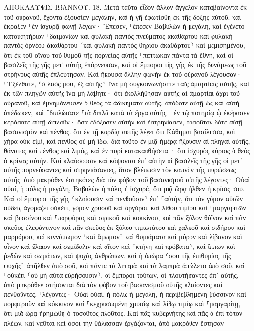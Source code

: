 \documentclass[twoside, 9pt]{extreport}
\begin{document}
ΑΠΟΚΑΛΥΨΙΣ ΙΩΑΝΝΟΥ.
18.
Μετὰ ταῦτα εἶδον ἄλλον ἄγγελον καταβαίνοντα ἐκ τοῦ οὐρανοῦ, ἔχοντα ἐξουσίαν μεγάλην, καὶ ἡ γῆ ἐφωτίσθη ἐκ τῆς δόξης αὐτοῦ. 
καὶ ἔκραξεν ⸀ἐν ἰσχυρᾷ φωνῇ λέγων· Ἔπεσεν, ⸀ἔπεσεν Βαβυλὼν ἡ μεγάλη, καὶ ἐγένετο κατοικητήριον ⸀δαιμονίων καὶ φυλακὴ παντὸς πνεύματος ἀκαθάρτου καὶ φυλακὴ παντὸς ὀρνέου ἀκαθάρτου ⸂καὶ φυλακὴ παντὸς θηρίου ἀκαθάρτου⸃ καὶ μεμισημένου, 
ὅτι ἐκ τοῦ οἴνου τοῦ θυμοῦ τῆς πορνείας αὐτῆς ⸀πέπτωκαν πάντα τὰ ἔθνη, καὶ οἱ βασιλεῖς τῆς γῆς μετ᾽ αὐτῆς ἐπόρνευσαν, καὶ οἱ ἔμποροι τῆς γῆς ἐκ τῆς δυνάμεως τοῦ στρήνους αὐτῆς ἐπλούτησαν. 
Καὶ ἤκουσα ἄλλην φωνὴν ἐκ τοῦ οὐρανοῦ λέγουσαν· ⸀Ἐξέλθατε, ⸂ὁ λαός μου, ἐξ αὐτῆς⸃, ἵνα μὴ συγκοινωνήσητε ταῖς ἁμαρτίαις αὐτῆς, καὶ ἐκ τῶν πληγῶν αὐτῆς ἵνα μὴ λάβητε· 
ὅτι ἐκολλήθησαν αὐτῆς αἱ ἁμαρτίαι ἄχρι τοῦ οὐρανοῦ, καὶ ἐμνημόνευσεν ὁ θεὸς τὰ ἀδικήματα αὐτῆς. 
ἀπόδοτε αὐτῇ ὡς καὶ αὐτὴ ἀπέδωκεν, καὶ ⸀διπλώσατε ⸀τὰ διπλᾶ κατὰ τὰ ἔργα αὐτῆς· ἐν τῷ ποτηρίῳ ᾧ ἐκέρασεν κεράσατε αὐτῇ διπλοῦν· 
ὅσα ἐδόξασεν αὑτὴν καὶ ἐστρηνίασεν, τοσοῦτον δότε αὐτῇ βασανισμὸν καὶ πένθος. ὅτι ἐν τῇ καρδίᾳ αὐτῆς λέγει ὅτι Κάθημαι βασίλισσα, καὶ χήρα οὐκ εἰμί, καὶ πένθος οὐ μὴ ἴδω. 
διὰ τοῦτο ἐν μιᾷ ἡμέρᾳ ἥξουσιν αἱ πληγαὶ αὐτῆς, θάνατος καὶ πένθος καὶ λιμός, καὶ ἐν πυρὶ κατακαυθήσεται· ὅτι ἰσχυρὸς κύριος ὁ θεὸς ὁ κρίνας αὐτήν. 
Καὶ κλαύσουσιν καὶ κόψονται ἐπ᾽ αὐτὴν οἱ βασιλεῖς τῆς γῆς οἱ μετ᾽ αὐτῆς πορνεύσαντες καὶ στρηνιάσαντες, ὅταν βλέπωσιν τὸν καπνὸν τῆς πυρώσεως αὐτῆς, 
ἀπὸ μακρόθεν ἑστηκότες διὰ τὸν φόβον τοῦ βασανισμοῦ αὐτῆς λέγοντες· Οὐαὶ οὐαί, ἡ πόλις ἡ μεγάλη, Βαβυλὼν ἡ πόλις ἡ ἰσχυρά, ὅτι μιᾷ ὥρᾳ ἦλθεν ἡ κρίσις σου. 
Καὶ οἱ ἔμποροι τῆς γῆς ⸂κλαίουσιν καὶ πενθοῦσιν⸃ ἐπ᾽ ⸀αὐτήν, ὅτι τὸν γόμον αὐτῶν οὐδεὶς ἀγοράζει οὐκέτι, 
γόμον χρυσοῦ καὶ ἀργύρου καὶ λίθου τιμίου καὶ ⸀μαργαριτῶν καὶ βυσσίνου καὶ ⸀πορφύρας καὶ σιρικοῦ καὶ κοκκίνου, καὶ πᾶν ξύλον θύϊνον καὶ πᾶν σκεῦος ἐλεφάντινον καὶ πᾶν σκεῦος ἐκ ξύλου τιμιωτάτου καὶ χαλκοῦ καὶ σιδήρου καὶ μαρμάρου, 
καὶ κιννάμωμον ⸂καὶ ἄμωμον⸃ καὶ θυμιάματα καὶ μύρον καὶ λίβανον καὶ οἶνον καὶ ἔλαιον καὶ σεμίδαλιν καὶ σῖτον καὶ ⸂κτήνη καὶ πρόβατα⸃, καὶ ἵππων καὶ ῥεδῶν καὶ σωμάτων, καὶ ψυχὰς ἀνθρώπων. 
καὶ ἡ ὀπώρα ⸂σου τῆς ἐπιθυμίας τῆς ψυχῆς⸃ ἀπῆλθεν ἀπὸ σοῦ, καὶ πάντα τὰ λιπαρὰ καὶ τὰ λαμπρὰ ἀπώλετο ἀπὸ σοῦ, καὶ ⸀οὐκέτι ⸂οὐ μὴ αὐτὰ εὑρήσουσιν⸃. 
οἱ ἔμποροι τούτων, οἱ πλουτήσαντες ἀπ᾽ αὐτῆς, ἀπὸ μακρόθεν στήσονται διὰ τὸν φόβον τοῦ βασανισμοῦ αὐτῆς κλαίοντες καὶ πενθοῦντες, 
⸀λέγοντες· Οὐαὶ οὐαί, ἡ πόλις ἡ μεγάλη, ἡ περιβεβλημένη βύσσινον καὶ πορφυροῦν καὶ κόκκινον καὶ ⸀κεχρυσωμένη χρυσίῳ καὶ λίθῳ τιμίῳ καὶ ⸀μαργαρίτῃ, 
ὅτι μιᾷ ὥρᾳ ἠρημώθη ὁ τοσοῦτος πλοῦτος. Καὶ πᾶς κυβερνήτης καὶ πᾶς ὁ ἐπὶ τόπον πλέων, καὶ ναῦται καὶ ὅσοι τὴν θάλασσαν ἐργάζονται, ἀπὸ μακρόθεν ἔστησαν 
\end{document}

